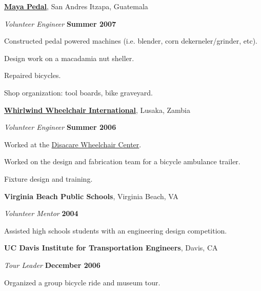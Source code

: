 \documentclass[10pt]{article}
\newenvironment{outerlist}[1][\enskip\textbullet]%
        {\begin{itemize}[#1]}{\end{itemize}%
         \vspace{-.6\baselineskip}}
\newenvironment{innerlist}[1][\enskip\textbullet]%
        {\begin{compactitem}[#1]}{\end{compactitem}}
\newcommand{\blankline}{\quad\pagebreak[2]}
\begin{document}
\blankline

\href{http://www.mayapedal.org/}{\textbf{Maya Pedal}}, San Andres Itzapa, Guatemala
\begin{outerlist}
  \item[] \textit{Volunteer Engineer}%
    \hfill \textbf{Summer 2007}
  \begin{innerlist}
    \item Constructed pedal powered machines (i.e. blender, corn
      dekerneler/grinder, etc).
    \item Design work on a macadamia nut sheller.
    \item Repaired bicycles.
    \item Shop organization: tool boards, bike graveyard.
  \end{innerlist}
\end{outerlist}

\blankline

\href{http://www.whirlwindwheelchair.org/}{\textbf{Whirlwind Wheelchair
International}}, Lusaka, Zambia
\begin{outerlist}
  \item[] \textit{Volunteer Engineer}%
    \hfill \textbf{Summer 2006}
  \begin{innerlist}
    \item Worked at the \href{http://www.disacare.org.zm/}{Disacare Wheelchair
      Center}.
    \item Worked on the design and fabrication team for a bicycle ambulance
      trailer.
    \item Fixture design and training.
  \end{innerlist}
\end{outerlist}

\blankline

{\textbf{Virginia Beach Public Schools}}, Virginia Beach, VA
\begin{outerlist}
  \item[] \textit{Volunteer Mentor}%
    \hfill \textbf{2004}
  \begin{innerlist}
    \item Assisted high schools students with an engineering design competition.
  \end{innerlist}
\end{outerlist}

\blankline

{\textbf{UC Davis Institute for Transportation Engineers}}, Davis, CA
\begin{outerlist}
  \item[] \textit{Tour Leader}%
    \hfill \textbf{December 2006}
  \begin{innerlist}
    \item Organized a group bicycle ride and museum tour.
  \end{innerlist}
\end{outerlist}
\end{document}
